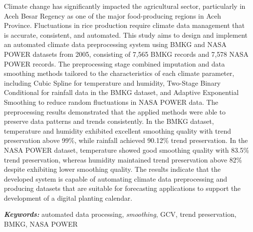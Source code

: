 \begin{abstracteng}
Climate change has significantly impacted the agricultural sector, particularly in Aceh Besar Regency as one of the major food-producing regions in Aceh Province. Fluctuations in rice production require climate data management that is accurate, consistent, and automated. This study aims to design and implement an automated climate data preprocessing system using BMKG and NASA POWER datasets from 2005, consisting of 7,565 BMKG records and 7,578 NASA POWER records. The preprocessing stage combined imputation and data smoothing methods tailored to the characteristics of each climate parameter, including Cubic Spline for temperature and humidity, Two-Stage Binary Conditional for rainfall data in the BMKG dataset, and Adaptive Exponential Smoothing to reduce random fluctuations in NASA POWER data. The preprocessing results demonstrated that the applied methods were able to preserve data patterns and trends consistently. In the BMKG dataset, temperature and humidity exhibited excellent smoothing quality with trend preservation above 99\%, while rainfall achieved 90.12\% trend preservation. In the NASA POWER dataset, temperature showed good smoothing quality with 83.5\% trend preservation, whereas humidity maintained trend preservation above 82\% despite exhibiting lower smoothing quality. The results indicate that the developed system is capable of automating climate data preprocessing and producing datasets that are suitable for forecasting applications to support the development of a digital planting calendar.

\bigskip
\noindent
\textit{\textbf{Keywords:}} automated data processing, \textit{smoothing}, GCV, trend preservation, BMKG, NASA POWER
\end{abstracteng}